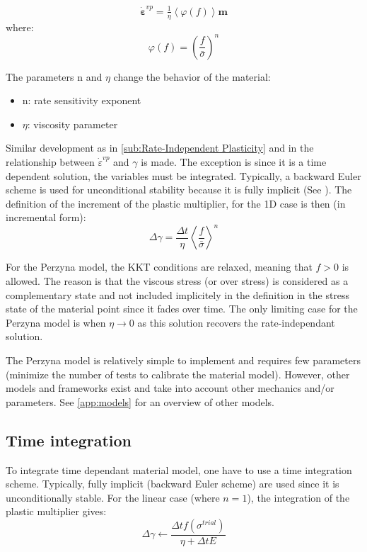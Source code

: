 \documentclass[final,5p,times,twocolumn]{elsarticle}
\begin{document}
\begin{equation}
  \boldsymbol{\dot{\varepsilon}}^{vp} = \tfrac{1}{\eta}\left\langle \varphi(f) \right\rangle \boldsymbol{m} \label{eq:perzyna1}
\end{equation}
where:
\begin{equation}
  \varphi(f)=\left( \dfrac{f}{\bar{\sigma}} \right)^{n}
\end{equation}

The parameters n and $\eta$ change the behavior of the material:
\begin{itemize}
  \item n: rate sensitivity exponent
  \item $\eta$: viscosity parameter
\end{itemize}

Similar development as in \cref{sub:Rate-Independent Plasticity} and in the relationship between $\dot{\varepsilon}^{vp}$ and $\gamma$ is made. The exception is since it is a time dependent solution, the variables must be integrated. Typically, a backward Euler scheme is used for unconditional stability because it is fully implicit (See \cite{MACrisfield2012,Simo1998Computational}). The definition of the increment of the plastic multiplier, for the 1D case is then (in incremental form):
\begin{equation}
  \Delta\gamma=\dfrac{\Delta t}{\eta}\left\langle \dfrac{f}{\bar{\sigma}} \right\rangle^{n}
\end{equation}

For the Perzyna model, the KKT conditions are relaxed, meaning that $f>0$ is allowed. The reason is that the viscous stress (or over stress) is considered as a complementary state and not included implicitely in the definition in the stress state of the material point since it fades over time. The only limiting case for the Perzyna model is when $\eta\rightarrow0$ as this solution recovers the rate-independant solution.

The Perzyna model is relatively simple to implement and requires few parameters (minimize the number of tests to calibrate the material model). However, other models and frameworks exist and take into account other mechanics and/or parameters. See \cref{app:models} for an overview of other models.

\subsection{Time integration}
\label{sub:timeint}
To integrate time dependant material model, one have to use a time integration scheme. Typically, fully implicit (backward Euler scheme) are used since it is unconditionally stable. For the linear case (where $n=1$), the integration of the plastic multiplier gives:
\begin{equation}
    \Delta \gamma \gets \dfrac{\Delta t f(\sigma^{trial})}{\eta +  \Delta t E}
\end{equation}
\end{document}
